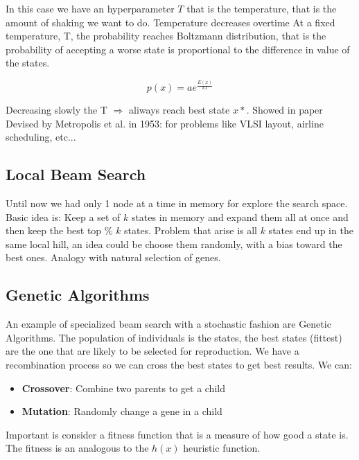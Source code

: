 \documentclass[12pt]{book}
\begin{document}
In this case we have an hyperparameter $T$ that is the temperature, that is the amount of shaking we want to do. Temperature decreases overtime
At a fixed temperature, T, the probability reaches Boltzmann distribution, that is the probability of accepting a worse state is proportional to the difference in value of the states.

\begin{equation}
	p(x) = ae^{\frac{E(x)}{kT}}
\end{equation}

Decreasing slowly the T $\Rightarrow$ {aliways reach best state $x*$.} \newline
\newline
Showed in paper Devised by Metropolis et al. in 1953: for problems like VLSI layout, airline scheduling, etc...

\subsection{Local Beam Search}
Until now we had only 1 node at a time in memory for explore the search space. 
Basic idea is: Keep a set of $k$ states in memory and expand them all at once and then keep the best top \% $k$ states.
Problem that arise is all $k$ states end up in the same local hill, an idea could be choose them randomly, with a bias toward the best ones.
Analogy with natural selection of genes.

\subsection{Genetic Algorithms}
An example of specialized beam search with a stochastic fashion are Genetic Algorithms.
The population of individuals is the states, the best states (fittest) are the one that are likely to be selected for reproduction.
We have a recombination process so we can cross the best states to get best results.
We can: \newline
\begin{itemize}
	\item \textbf{Crossover}: Combine two parents to get a child
	\item \textbf{Mutation}: Randomly change a gene in a child
\end{itemize}
Important is consider a fitness function that is a measure of how good a state is.
The fitness is an analogous to the $h(x)$ heuristic function.
\end{document}
